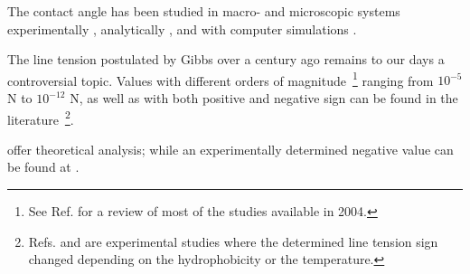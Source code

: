 The contact angle has been studied in macro- and microscopic systems
experimentally \cite{meiron:2004,tadmor:2008,extrand:2003}, analytically
\cite{kwok:1999,decker:1999}, and with computer simulations \cite{werder:2003,gietzelt:2001}.

The line tension \textendash{} postulated by Gibbs over a century
ago \cite{gibbs:1873,gibbs:1948} \textendash{} remains to our days
a controversial topic. Values with different orders of magnitude~\footnote{See Ref. \cite{amirfazli:2004} for a review of most of the studies available in 2004.}
ranging from $10^{-5}$ N to $10^{-12}$ N, as well as with both positive
\cite{weijs:2011,koga:2007,amirfazli:2003,lee:2003,werder:2003} and
negative sign \cite{lin:2012,hienola:2007} can be found in the literature~\footnote{Refs. \cite{pompe:2002} and \cite{wang:2001} are experimental studies where the determined line tension sign changed depending on the hydrophobicity or the temperature.}.

\cite{rusanov:1999,taylor:2005,schimmele:2007,weijs:2011} offer theoretical
analysis; while an experimentally determined negative value can be
found at \cite{hienola:2007}.